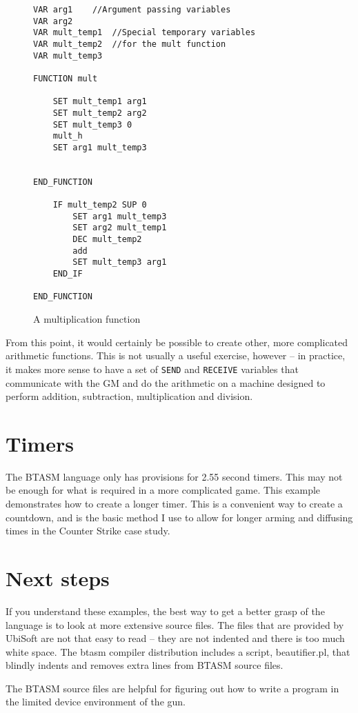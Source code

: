 \documentclass[12pt,a4paper]{scrbook}
\begin{document}
\begin{figure}[h]
\begin{lstlisting}
VAR arg1	//Argument passing variables
VAR arg2
VAR mult_temp1	//Special temporary variables
VAR mult_temp2	//for the mult function
VAR mult_temp3

FUNCTION mult

	SET mult_temp1 arg1
	SET mult_temp2 arg2
	SET mult_temp3 0
	mult_h
	SET arg1 mult_temp3
	
	
END_FUNCTION
	
	IF mult_temp2 SUP 0
		SET arg1 mult_temp3
		SET arg2 mult_temp1
		DEC mult_temp2
		add
		SET mult_temp3 arg1
	END_IF
	
END_FUNCTION
\end{lstlisting}
\caption{A multiplication function} 
\end{figure}

From this point, it would certainly be possible to create other, more complicated arithmetic
functions.  This is not usually a useful exercise, however -- in practice, it makes more sense to
have a set of \texttt{SEND} and \texttt{RECEIVE} variables that communicate with the GM and do
the arithmetic on a machine designed to perform addition, subtraction, multiplication and division.

\section{Timers}
The BTASM language only has provisions for 2.55 second timers.  This may not be enough for what is
required in a more complicated game.  This example demonstrates how to create a longer timer.
This is a convenient way to create a countdown, and is the basic method I use to allow for longer
arming and diffusing times in the Counter Strike case study.

\section{Next steps}
If you understand these examples, the best way to get a better grasp of the language is to look at
more extensive source files.  The files that are provided by UbiSoft are not that easy to read --
they are not indented and there is too much white space.  The btasm compiler distribution includes
a script, beautifier.pl, that blindly indents and removes extra lines from BTASM source files.

The BTASM source files are helpful for figuring out how to write a program in the limited 
device environment of the gun. 
\end{document}
